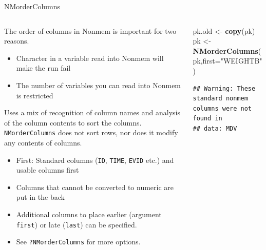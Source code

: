 \documentclass[
  8pt,
  ignorenonframetext,
  aspectratio=169]{beamer}
\newenvironment{Shaded}{\begin{snugshade}}{\end{snugshade}}
\newcommand{\DataTypeTok}[1]{\textcolor[rgb]{0.13,0.29,0.53}{#1}}
\newcommand{\KeywordTok}[1]{\textcolor[rgb]{0.13,0.29,0.53}{\textbf{#1}}}
\newcommand{\NormalTok}[1]{#1}
\newcommand{\StringTok}[1]{\textcolor[rgb]{0.31,0.60,0.02}{#1}}
\providecommand{\tightlist}{%
  \setlength{\itemsep}{0pt}\setlength{\parskip}{0pt}}
\begin{document}
\begin{frame}[fragile]{NMorderColumns}
\protect\hypertarget{nmordercolumns}{}
\begin{columns}[T]
\begin{column}{0.48\textwidth}
\vspace{12pt}

The order of columns in Nonmem is important for two reasons.

\begin{itemize}
\tightlist
\item
  Character in a variable read into Nonmem will make the run fail
\item
  The number of variables you can read into Nonmem is restricted
\end{itemize}

Uses a mix of recognition of column names and analysis of the column
contents to sort the columns. \texttt{NMorderColumns} does not sort
rows, nor does it modify any contents of columns.

\begin{itemize}
\item
  First: Standard columns (\texttt{ID}, \texttt{TIME}, \texttt{EVID}
  etc.) and usable columns first
\item
  Columns that cannot be converted to numeric are put in the back
\item
  Additional columns to place earlier (argument \texttt{first}) or late
  (\texttt{last}) can be specified.
\item
  See \texttt{?NMorderColumns} for more options.
\end{itemize}
\end{column}

\begin{column}{0.48\textwidth}
\footnotesize

\begin{Shaded}
\begin{Highlighting}[]
\NormalTok{pk.old \textless{}{-}}\StringTok{ }\KeywordTok{copy}\NormalTok{(pk)}
\NormalTok{pk \textless{}{-}}\StringTok{ }\KeywordTok{NMorderColumns}\NormalTok{(pk,}\DataTypeTok{first=}\StringTok{"WEIGHTB"}\NormalTok{)}
\end{Highlighting}
\end{Shaded}

\begin{verbatim}
## Warning: These standard nonmem columns were not found in
## data: MDV
\end{verbatim}


\end{column}
\end{columns}
\end{frame}
\end{document}
